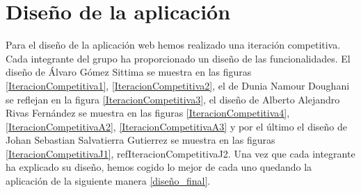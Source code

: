 \section{Diseño de la aplicación}
\label{disenyoDeLaAplicacion}
Para el diseño de la aplicación web hemos realizado una iteración competitiva. Cada integrante del grupo ha proporcionado un diseño de las funcionalidades. El diseño de Álvaro Gómez Sittima se muestra en las figuras \ref{IteracionCompetitiva1}, \ref{IteracionCompetitiva2}, el de Dunia Namour Doughani se reflejan en la figura \ref{IteracionCompetitiva3}, el diseño de Alberto Alejandro Rivas Fernández se muestra en las figuras \ref{IteracionCompetitiva4}, \ref{IteracionCompetitivaA2}, \ref{IteracionCompetitivaA3} y por el último el diseño de Johan Sebastian Salvatierra Gutierrez se muestra en las figuras \ref{IteracionCompetitivaJ1}, ref{IteracionCompetitivaJ2}. Una vez que cada integrante ha explicado su diseño, hemos cogido lo mejor de cada uno quedando la aplicación de la siguiente manera \ref{diseño_final}.


